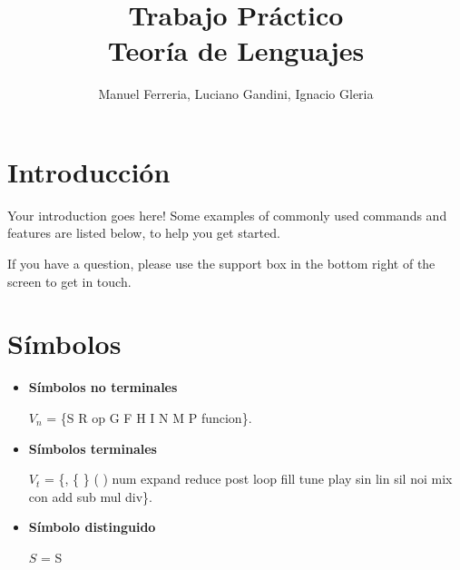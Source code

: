 \documentclass[a4paper]{article}
\title{Trabajo Práctico \\ Teoría de Lenguajes}
\author{Manuel Ferreria, Luciano Gandini, Ignacio Gleria}
\begin{document}
\maketitle



\section{Introducción}

Your introduction goes here! Some examples of commonly used commands and features are listed below, to help you get started.

If you have a question, please use the support box in the bottom right of the screen to get in touch. 

\section{Símbolos}

\begin{itemize}
\item \textbf{Símbolos no terminales}

\begin{center}
$V_n$ = \{S R op G F H I N M P funcion\}.
\end{center}

\item \textbf{Símbolos terminales}

\begin{center}
$V_t$ = \{, \{ \} ( ) num expand reduce post loop fill tune play sin lin sil noi mix con add sub mul div\}.
\end{center}

\item \textbf{Símbolo distinguido}

\begin{center}
$S$ = S 
\end{center}
\end{itemize}
\end{document}
